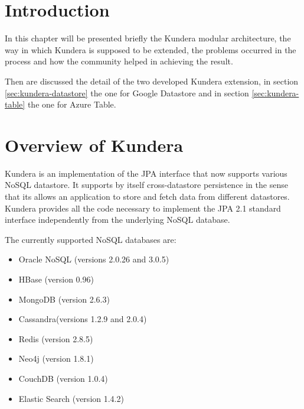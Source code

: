 \section{Introduction}
In this chapter will be presented briefly the Kundera modular architecture, the way in which Kundera is supposed to be extended, the problems occurred in the process and how the community helped in achieving the result.

\noindent Then are discussed the detail of the two developed Kundera extension, in section \ref{sec:kundera-datastore} the one for Google Datastore and in section \ref{sec:kundera-table} the one for Azure Table.

\section{Overview of Kundera}
Kundera \cite{online:kundera} is an implementation of the JPA interface that now supports various NoSQL datastore. It supports by itself cross-datastore persistence in the sense that its allows an application to store and fetch data from different datastores.
Kundera provides all the code necessary to implement the JPA 2.1 standard interface independently from the underlying NoSQL database. 

\newparagraph The currently supported NoSQL databases are:
\begin{itemize}
\item Oracle NoSQL (versions 2.0.26 and 3.0.5)
\item HBase (version 0.96)
\item MongoDB (version 2.6.3)
\item Cassandra(versions 1.2.9 and 2.0.4)
\item Redis (version 2.8.5)
\item Neo4j (version 1.8.1)
\item CouchDB (version 1.0.4)
\item Elastic Search (version 1.4.2)
\end{itemize}

